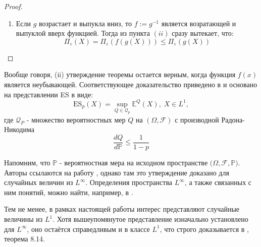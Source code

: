 \documentclass[12pt]{article}
\theoremstyle{plain}
\theoremstyle{definition}
\theoremstyle{remark}
\begin{document}
\begin{proof}
\begin{enumerate}[label=(\roman*):, font=\textit]
    Неравенство Йенсена так же справедливо для условного матожидания: в тех же предположениях на $\varphi(x)$ выполнено: 
    \[
        \varphi(\mathbb{E}[X|\mathcal{A}]) \leq \mathbb{E}[\varphi(X)|\mathcal{A}],
    \]
    где $\mathcal{A} \subset \mathcal{F}$ - некоторая под-$\sigma$-алгебра.
    
    Теперь покажем, что ES$_p(f(X)) \leq$ $f(\text{ES}_p(X))$. Для этого воспользуемся определением ES через условное матожидание:
    \[
        \text{ES}_p(f(X))= \mathbb{E}[f(X)|f(X)>F^{-1}_{f(X)}(p)] = \mathbb{E}[f(X)|f(X)>f(F^{-1}_X(p))] =  
    \]
    \[
        = \mathbb{E}[f(X)|X>F^{-1}_X(p)] \leq f(\mathbb{E}[X|X>F^{-1}_X(p)]) = f(\text{ES}_p(X))
    \]

    Отсюда 
    \[
        \text{ES}_{1-c_2\varepsilon}(f(X))\leq f(\text{ES}_{1-c_2\varepsilon}(X)) = f(\text{VaR}_{1-\varepsilon}(X))= \text{VaR}_{1-\varepsilon}(f(X))= \text{ES}_{1-c_1\varepsilon}(f(X))
    \]
    И, наконец, в силу монотонности ES$_p(f(X))$:
    \[
        1-c_2\varepsilon \leq 1-c_1\varepsilon \iff c_1 \leq c_2
    \]
    \item
    Если $g$ возрастает и выпукла вниз, то $f := g^{-1}$ является возратающей и выпуклой вверх функцией. Тогда из пункта $(ii)$ сразу вытекает, что:
    \[
        \Pi_\varepsilon(X) = \Pi_\varepsilon(f(g(X))) \leq \Pi_\varepsilon(g(X))
    \]

\end{enumerate}
    
\end{proof}

Вообще говоря, (ii) утверждение теоремы остается верным, когда функция $f(x)$ является неубывающей. Соответствующее доказательство приведено в \cite{метка0} и основано на представлении ES в виде:
\[
    \text{ES}_p(X) = \sup_{Q \in \mathcal{Q}_p}\mathbb{E}^Q(X),\; X \in L^1,
\]
где $\mathcal{Q}_P$ - множество вероятностных мер $Q$ на $(\Omega, \mathcal{F})$ с производной Радона-Никодима 
\[
    \frac{dQ}{d\mathbb{P}}\leq \frac{1}{1-p}
\]

Напомним, что $\mathbb{P}$ - вероятностная мера на исходном пространстве $(\Omega, \mathcal{F}, \mathbb{P)}$. Авторы ссылаются на работу \cite{Embrechts}, однако там это утверждение доказано для случайных величин из $L^\infty$. Определения пространства $L^\infty$, а также связанных с ним понятий, можно найти, например, в \cite{Billingsley}.

Тем не менее, в рамках настоящей работы интерес представляют случайные величины из $L^1$. Хотя вышеупомянутое представление изначально установлено для $L^\infty$, оно остаётся справедливым и в классе $L^1$, что строго доказывается в \cite{McNeil}, теорема 8.14.
\end{document}
